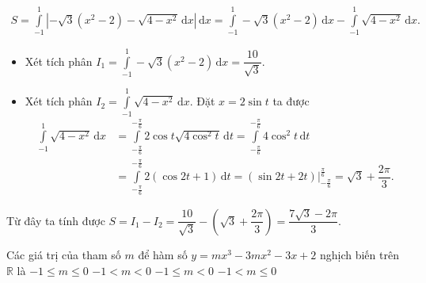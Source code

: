\begin{ex}
{{}
\begin{align*}
S = \displaystyle \int\limits_{-1}^1 \left| -\sqrt{3} \left(x^2 - 2\right) - \sqrt{4 - x^2}\, \mathrm{d}x \right|\, \mathrm{d}x = \int\limits_{-1}^1 -\sqrt{3} \left(x^2 - 2\right)\, \mathrm{d}x - \int\limits_{-1}^1 \sqrt{4 - x^2} \, \mathrm{d}x.
\end{align*}
\begin{itemize}
\item Xét tích phân $I_1 = \displaystyle \int\limits_{-1}^1 -\sqrt{3} \left(x^2 - 2\right)\, \mathrm{d}x = \dfrac{10}{\sqrt{3}}$.
\item Xét tích phân $I_2 = \displaystyle\int\limits_{-1}^1 \sqrt{4-x^2} \, \mathrm{d} x$. Đặt $x = 2\sin t$ ta được 
\begin{align*} \displaystyle\int\limits_{-1}^1 \sqrt{4-x^2} \, \mathrm{d} x &= \int\limits_{-\frac{\pi}{6}}^{-\frac{\pi}{6}} 2\cos t \sqrt{4 \cos ^2 t} \, \mathrm{d}t = \int\limits_{-\frac{\pi}{6}}^{-\frac{\pi}{6}} 4\cos ^2t \, \mathrm{d}t\\
&= \int\limits_{-\frac{\pi}{6}}^{-\frac{\pi}{6}} 2\left(\cos 2t + 1\right)\, \mathrm{d}t = \left(\sin 2t + 2t \right)\bigg|_{-\frac{\pi}{6}}^{\frac{\pi}{6}}= \sqrt{3}+\dfrac{2\pi }{3}.
\end{align*}
\end{itemize}
Từ đây ta tính được $S = I_1 - I_2 = \dfrac{10}{\sqrt{3}}-\left(\sqrt{3}+\dfrac{2\pi}{3}\right) = \dfrac{7\sqrt{3} - 2\pi}{3}.$
}
\end{ex}


\begin{ex}%
Các giá trị của tham số $m$ để hàm số $y = mx^3 - 3mx^2 - 3x + 2$ nghịch biến trên $\mathbb{R}$ là
\choice
{\True $-1 \leq m \leq 0$}
{$-1 < m < 0$}
{$-1 \leq m < 0$}
{$-1 < m \leq 0$}
\end{ex}


